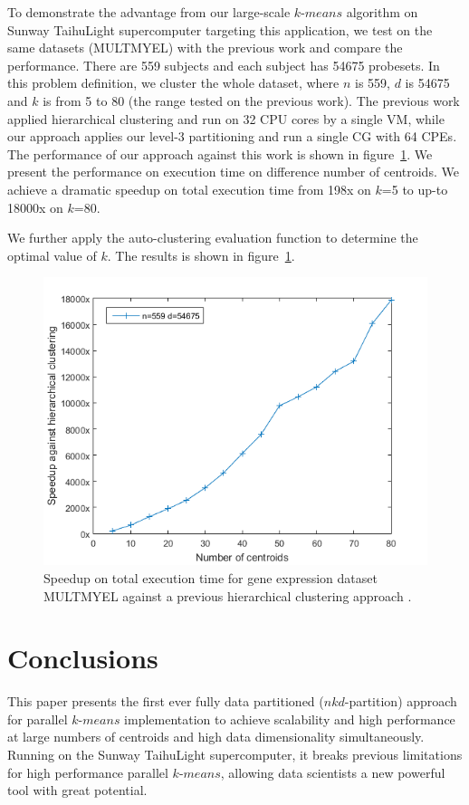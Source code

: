 \documentclass[10pt,journal,compsoc]{IEEEtran}
\begin{document}
{To demonstrate the advantage from our large-scale $k$-$means$ algorithm on Sunway TaihuLight supercomputer targeting this application, we test on the same datasets (MULTMYEL) \cite{genedata} with the previous work \cite{wang2014optimising} and compare the performance. There are 559 subjects and each subject has 54675 probesets. In this problem definition, we cluster the whole dataset, where $n$ is 559, $d$ is 54675 and $k$ is from 5 to 80 (the range tested on the previous work). The previous work applied hierarchical clustering and run on 32 CPU cores by a single VM, while our approach applies our level-3 partitioning and run a single CG with 64 CPEs. The performance of our approach against this work is shown in figure~\ref{compare_g}. We present the performance on execution time on difference number of centroids. We achieve a dramatic speedup on total execution time from 198x on $k$=5 to up-to 18000x on $k$=80. 

We further apply the auto-clustering evaluation function to determine the optimal value of $k$. The results is shown in figure~\ref{}.

\begin{figure}
\centering
\includegraphics[scale=0.50]{compare.png}
\caption{ Speedup on total execution time for gene expression dataset MULTMYEL \cite{genedata} against a previous hierarchical clustering approach \cite{wang2014optimising}.
}
\label{compare_g}
\end{figure}

\section{Conclusions}
This paper presents the first ever fully data partitioned ($nkd$-partition) approach for parallel $k$-$means$ implementation to achieve scalability and high performance at large numbers of centroids and high data dimensionality simultaneously. Running on the Sunway TaihuLight supercomputer, it breaks previous limitations for high performance parallel $k$-$means$, allowing data scientists a new powerful tool with great potential.

}
\end{document}
